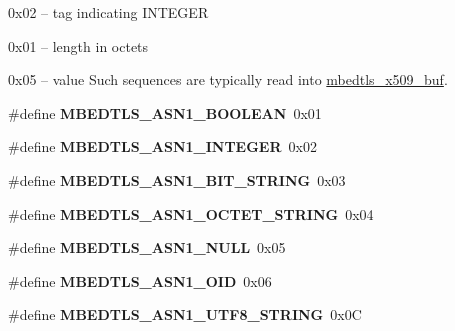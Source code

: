 \begin{DoxyItemize}
\item 0x02 -- tag indicating I\-N\-T\-E\-G\-E\-R
\item 0x01 -- length in octets
\item 0x05 -- value Such sequences are typically read into {\ttfamily \hyperlink{group__x509__module_ga4d02c9e8e4e2934555e0d132cd2976dc}{mbedtls\-\_\-x509\-\_\-buf}}. 
\end{DoxyItemize}\begin{DoxyCompactItemize}
\item 
\hypertarget{group__asn1__module_ga1382980a474a765365d8f5c7bd63795a}{\#define {\bfseries M\-B\-E\-D\-T\-L\-S\-\_\-\-A\-S\-N1\-\_\-\-B\-O\-O\-L\-E\-A\-N}~0x01}\label{group__asn1__module_ga1382980a474a765365d8f5c7bd63795a}

\item 
\hypertarget{group__asn1__module_ga6e8614f8937956c294fe791bc5ac6a7c}{\#define {\bfseries M\-B\-E\-D\-T\-L\-S\-\_\-\-A\-S\-N1\-\_\-\-I\-N\-T\-E\-G\-E\-R}~0x02}\label{group__asn1__module_ga6e8614f8937956c294fe791bc5ac6a7c}

\item 
\hypertarget{group__asn1__module_gafd5c5ecc822b7e2f4d2e64bf388fc559}{\#define {\bfseries M\-B\-E\-D\-T\-L\-S\-\_\-\-A\-S\-N1\-\_\-\-B\-I\-T\-\_\-\-S\-T\-R\-I\-N\-G}~0x03}\label{group__asn1__module_gafd5c5ecc822b7e2f4d2e64bf388fc559}

\item 
\hypertarget{group__asn1__module_ga080d1f82b0996a63c561541eb22a7d0f}{\#define {\bfseries M\-B\-E\-D\-T\-L\-S\-\_\-\-A\-S\-N1\-\_\-\-O\-C\-T\-E\-T\-\_\-\-S\-T\-R\-I\-N\-G}~0x04}\label{group__asn1__module_ga080d1f82b0996a63c561541eb22a7d0f}

\item 
\hypertarget{group__asn1__module_gae26e36d787617e0b2dd067ccc342db0d}{\#define {\bfseries M\-B\-E\-D\-T\-L\-S\-\_\-\-A\-S\-N1\-\_\-\-N\-U\-L\-L}~0x05}\label{group__asn1__module_gae26e36d787617e0b2dd067ccc342db0d}

\item 
\hypertarget{group__asn1__module_gad87ad0570a31add4ecac6cc3694ca79a}{\#define {\bfseries M\-B\-E\-D\-T\-L\-S\-\_\-\-A\-S\-N1\-\_\-\-O\-I\-D}~0x06}\label{group__asn1__module_gad87ad0570a31add4ecac6cc3694ca79a}

\item 
\hypertarget{group__asn1__module_gafc28060cb0e9b2be4f0960ad345a2e42}{\#define {\bfseries M\-B\-E\-D\-T\-L\-S\-\_\-\-A\-S\-N1\-\_\-\-U\-T\-F8\-\_\-\-S\-T\-R\-I\-N\-G}~0x0\-C}\label{group__asn1__module_gafc28060cb0e9b2be4f0960ad345a2e42}


\end{DoxyCompactItemize}
